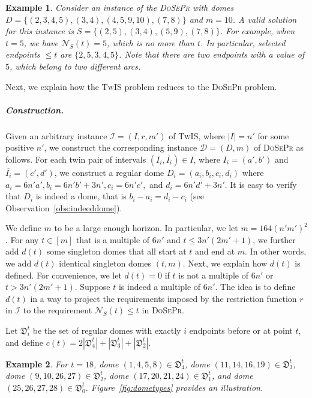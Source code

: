 \documentclass[letterpaper,11pt]{article}
\newtheorem{example}{Example}
\newcommand{\tis}{\textsc{TwIS}\xspace}
\newcommand{\dspr}{\textsc{DoSePr}\xspace}
\begin{document}
\begin{example}\label{example:dspr}
        Consider an instance of the \dspr with domes \linebreak$D= \{(2,3,4,5), (3,4), (4,5,9,10), (7,8)\}$ and $m=10$. A valid solution for this instance is $S= \{(2,5), (3,4), (5,9),(7,8)\}$. For example, when $t=5$, we have $\mathcal{N}_S(t) = 5$, which is no more than $t$. 
        In particular, selected endpoints $\leq t$ are $\{2,5,3,4,5\}$.   
        Note that there are two endpoints with a value of $5$, which belong to two different arcs.
\end{example}

Next, we explain how the \tis problem reduces to the \dspr problem.

\subparagraph*{Construction.}
Given an arbitrary instance $\mathcal{I} = (I,r, m')$ of \tis, where $|I| = n'$ for some positive $n'$, we construct the corresponding instance $\mathcal{D} = (D,m)$ of \dspr as follows. For each twin pair of intervals $(I_i, \overline{I_i}) \in I$, where $I_i = (a', b')$ and $\overline{I_i} = (c', d')$, we construct a regular dome $D_i = (a_i,b_i,c_i,d_i)$ where $a_i = 6n'a', b_i = 6n'b'+3n', c_i = 6n'c',$ and $d_i = 6n'd'+3n'$. 
It is easy to verify that $D_i$ is indeed a dome, that is $b_i-a_i=d_i-c_i$ (see Observation~\ref{obs:indeeddome}).

We define $m$ to be a large enough horizon. In particular, we let $m = 164(n'm')^2$. For any $t \in [m]$ that is a multiple of $6n'$ and $t\leq 3n'(2m'+1)$, we further add $d(t)$ some singleton domes that all start at $t$ and end at $m$. In other words, we add $d(t)$ identical singleton domes $(t,m)$. Next, we explain how $d(t)$ is defined.  For convenience, we let $d(t) = 0$ if $t$ is not a multiple of $6n'$ or $t> 3n'(2m'+1)$. Suppose $t$ is indeed a multiple of $6n'$.
The idea is to define $d(t)$ in a way to project the requirements imposed by the restriction function $r$ in $\mathcal{I}$ to the requirement $\mathcal{N}_S(t)\leq t$ in \dspr.


Let $\mathfrak{D}_i^t$ be the set of regular domes with exactly $i$ endpoints before or at point $t$, and define $c(t) = 2|\mathfrak{D}_4^t| + |\mathfrak{D}_3^t| + |\mathfrak{D}_2^t|$. 
\begin{example}
   For $t = 18$, dome $(1,4,5,8) \in \mathfrak{D}_4^t$, dome $(11,14,16,19)\in \mathfrak{D}_3^t$, dome $(9,10,26,27) \in \mathfrak{D}_2^t$, dome $(17,20,21,24)\in \mathfrak{D}_1^t$, and dome $(25,26,27,28) \in \mathfrak{D}_0^t$. Figure~\ref{fig:dometypes} provides an illustration.
\end{example}
\end{document}
